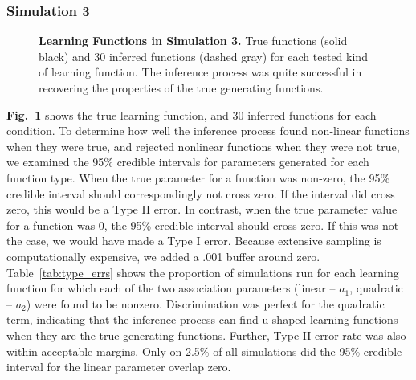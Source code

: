 \documentclass[12pt]{article}
\begin{document}
\subsubsection*{Simulation 3}

\begin{figure}[!h]
\caption{\textbf{Learning Functions in Simulation 3.} True functions (solid black) and 30 inferred functions (dashed gray) for each tested kind of learning function. The inference process was quite successful in recovering the properties of the true generating functions.}
\label{fig:sim3}
\end{figure}


	\textbf{Fig.~\ref{fig:sim3}} shows the true learning function, and 30 inferred functions for each condition. To determine how well the inference process found non-linear functions when they were true, and rejected nonlinear functions when they were not true, we examined the 95\% credible intervals for parameters generated for each function type. When the true parameter for a function was non-zero, the 95\% credible interval should correspondingly not cross zero. If the interval did cross zero, this would be a Type II error. In contrast, when the true parameter value for a function was 0, the 95\% credible interval should cross zero. If this was not the case, we would have made a Type I error. Because extensive sampling is computationally expensive, we added a .001 buffer around zero. Table~\ref{tab:type_errs} shows the proportion of simulations run for each learning function for which each of the two association parameters (linear -- $a_{1}$, quadratic -- $a_{2}$) were found to be nonzero. Discrimination was perfect for the quadratic term, indicating that the inference process can find u-shaped learning functions when they are the true generating functions. Further, Type II error rate was also within acceptable margins. Only on 2.5\% of all simulations did the 95\% credible interval for the linear parameter overlap zero. 
\end{document}
